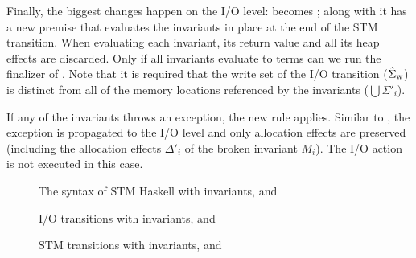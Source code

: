 Finally, the biggest changes happen on the I/O level:
 becomes ;
along with  it has a new premise that evaluates the invariants in place at the end of the STM transition.
When evaluating each invariant, its return value and all its heap effects are discarded.
Only if all invariants evaluate to  terms can we run the finalizer of .
Note that it is required that the write set of the I/O transition ($\hat{\Sigma}_\textsc{w}$) is distinct from all of the memory locations referenced by the invariants ($\bigcup\Sigma'_i$).

If any of the invariants throws an exception, the new rule  applies.
Similar to , the exception is propagated to the I/O level and only allocation effects are preserved (including the allocation effects $\Delta'_i$ of the broken invariant $M_i$).
The I/O action is not executed in this case.

\begin{figure}[p]

\caption{The syntax of STM Haskell with invariants,  and }
\label{fig:final-syntax}
\end{figure}

\begin{figure}[p]

\caption{I/O transitions with invariants,  and }
\label{fig:final-io}
\end{figure}

\begin{figure}[p]

\caption{STM transitions with invariants,  and }
\label{fig:final-stm}
\end{figure}

\clearpage